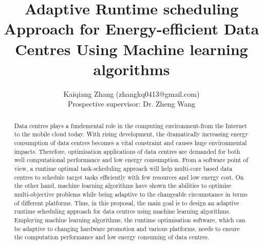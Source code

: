 \documentclass[11pt]{article}
\title{Adaptive Runtime scheduling Approach for Energy-efficient Data Centres Using Machine learning algorithms}
\author{Kaiqiang Zhang (zhangkq0413@gmail.com) \\ Prospective supervisor:  Dr. Zheng Wang}
\begin{document}
\lstset{language=C++,basicstyle=\small,
        stringstyle=\ttfamily,showstringspaces=false}

\singlespace
\maketitle

\begin{abstract}                %
Data centres plays a fundemental role in the computing environment-from the Internet to the mobile cloud today. With rising development, the dramatically increasing energy consumption of data centres becomes a vital constraint and causes huge environmental impacts. Therefore, optimisation applications of data centres are demanded for both well computational performance and low energy consumption. From a software point of view, a runtime optimal task-scheduling approach will help multi-core based data centres to schedule target tasks efficiently with few resources and low energy cost. On the other hand, machine learning algorithms have shown the abilities to optimise multi-objective problems while being adaptive to the changeable circumstance in terms of different platforms. Thus, in this proposal, the main goal is to design an adaptive runtime scheduling approach for data centres using machine learning algorithms. Employing machine learning algorithms, the runtime optimisation software, which can be adaptive to changing hardware promotion and various platforms, needs to ensure the computation performance and low energy consuming of data centres.
\end{abstract}

\doublespace
\setcounter{secnumdepth}{2}
\end{document}

